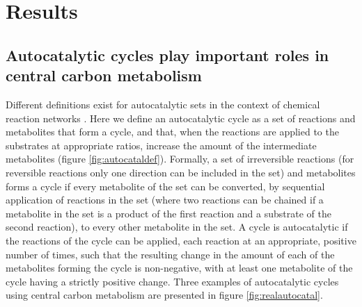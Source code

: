 \section{Results}
\subsection{Autocatalytic cycles play important roles in central carbon metabolism}
Different definitions exist for autocatalytic sets in the context of chemical reaction networks \cite{Hordijk2004-xe, Eigen2012-ti, Kun2008-xg}.
Here we define an autocatalytic cycle as a set of reactions and metabolites that form a cycle, and that, when the reactions are applied to the substrates at appropriate ratios, increase the amount of the intermediate metabolites (figure \ref{fig:autocataldef}).
Formally, a set of irreversible reactions (for reversible reactions only one direction can be included in the set) and metabolites forms a cycle if every metabolite of the set can be converted, by sequential application of reactions in the set (where two reactions can be chained if a metabolite in the set is a product of the first reaction and a substrate of the second reaction), to every other metabolite in the set.
A cycle is autocatalytic if the reactions of the cycle can be applied, each reaction at an appropriate, positive number of times, such that the resulting change in the amount of each of the metabolites forming the cycle is non-negative, with at least one metabolite of the cycle having a strictly positive change.
Three examples of autocatalytic cycles using central carbon metabolism are presented in figure \ref{fig:realautocatal}.
